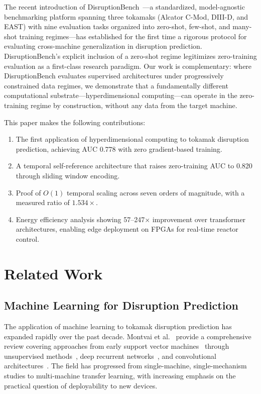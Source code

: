 \documentclass[twocolumn,prl,aps,superscriptaddress,floatfix]{revtex4-2}
\begin{document}
The recent introduction of DisruptionBench~\cite{Spangher2025}---a standardized, model-agnostic benchmarking platform spanning three tokamaks (Alcator C-Mod, DIII-D, and EAST) with nine evaluation tasks organized into zero-shot, few-shot, and many-shot training regimes---has established for the first time a rigorous protocol for evaluating cross-machine generalization in disruption prediction. DisruptionBench's explicit inclusion of a zero-shot regime legitimizes zero-training evaluation as a first-class research paradigm. Our work is complementary: where DisruptionBench evaluates supervised architectures under progressively constrained data regimes, we demonstrate that a fundamentally different computational substrate---hyperdimensional computing---can operate in the zero-training regime by construction, without any data from the target machine.

This paper makes the following contributions:
\begin{enumerate}
\item The first application of hyperdimensional computing to tokamak disruption prediction, achieving AUC 0.778 with zero gradient-based training.
\item A temporal self-reference architecture that raises zero-training AUC to 0.820 through sliding window encoding.
\item Proof of $O(1)$ temporal scaling across seven orders of magnitude, with a measured ratio of $1.534\times$.
\item Energy efficiency analysis showing 57--247$\times$ improvement over transformer architectures, enabling edge deployment on FPGAs for real-time reactor control.
\end{enumerate}

\section{Related Work}
\label{sec:related}

\subsection{Machine Learning for Disruption Prediction}

The application of machine learning to tokamak disruption prediction has expanded rapidly over the past decade. Montvai et al.~\cite{Montvai2023} provide a comprehensive review covering approaches from early support vector machines~\cite{Ratta2010} through unsupervised methods~\cite{Murari2009}, deep recurrent networks~\cite{KatesHarbeck2019}, and convolutional architectures~\cite{Churchill2020}. The field has progressed from single-machine, single-mechanism studies to multi-machine transfer learning, with increasing emphasis on the practical question of deployability to new devices.
\end{document}
